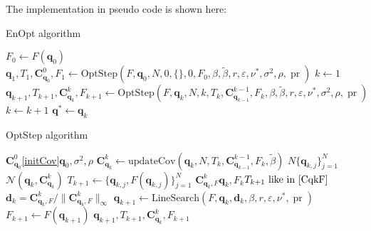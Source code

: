 The implementation in pseudo code is shown here:
\begin{algorithm}[H]%
\caption{EnOpt algorithm}
\begin{algorithmic}[1]
\State $F_{{0}}\gets F(\mathbf{q}_0)$
\State $\mathbf{q}_{1},T_{1},\mathbf{C}_{\mathbf{q}_{0}}^{0},F_{1}\gets\mathrm{OptStep}(F,\mathbf{q}_0,N,0,\{\},0,F_{0},\beta,\tilde{\beta},r,\varepsilon,\nu^*,\sigma^2,\rho,\operatorname{pr})$
\State $k\gets 1$
\State $\mathbf{q}_{k+1},T_{k+1},\mathbf{C}_{\mathbf{q}_{k}}^{k},F_{k+1}\gets\mathrm{OptStep}(F,\mathbf{q}_k,N,k,T_k,\mathbf{C}_{\mathbf{q}_{k-1}}^{k-1},F_k,\beta,\tilde{\beta},r,\varepsilon,\nu^*,\sigma^2,\rho,\operatorname{pr})$
\State $k\gets k+1$
\EndWhile
\State \Return $\mathbf{q}^*\gets\mathbf{q}_k$
\EndProcedure
\end{algorithmic}
\end{algorithm}
\begin{algorithm}[H]%
\caption{OptStep algorithm}
\begin{algorithmic}[1]
\State {}$\mathbf{C}_{\mathbf{q}_0}^0$\eqref{initCov}$\mathbf{q}_0,\sigma^2,\rho$
\Else
\State $\mathbf{C}_{\mathbf{q}_{k}}^{k} \gets \mathrm{updateCov}(\mathbf{q}_k, N, T_k, \mathbf{C}_{\mathbf{q}_{k-1}}^{k-1}, F_k ,\tilde{\beta})$
\EndIf
\State {}$N$$\{\mathbf{q}_{k,j}\}_{j=1}^N$$\mathcal{N}(\mathbf{q}_{k},\mathbf{C}_{\mathbf{q}_{k}}^{k})$
\State $T_{k+1}\gets\{\mathbf{q}_{k,j},F(\mathbf{q}_{k,j})\}_{j=1}^N$
\State {}$\mathbf{C}_{\mathbf{q}_{k},F}^{k}$$\mathbf{q}_k,F_k$$T_{k+1}\text{ like in }\eqref{CqkF}$
\State {}$\mathbf{d}_k=\mathbf{C}_{\mathbf{q}_{k},F}^{k}/\|\mathbf{C}_{\mathbf{q}_{k},F}^{k}\|_\infty$
\State $\mathbf{q}_{k+1}\gets\mathrm{LineSearch}(F,\mathbf{q}_k,\mathbf{d}_k,\beta,r,\varepsilon,\nu^*,\operatorname{pr})$
\State $F_{k+1}\gets F(\mathbf{q}_{k+1})$
\State \Return $\mathbf{q}_{k+1},T_{k+1},\mathbf{C}_{\mathbf{q}_k}^k,F_{k+1}$
\EndProcedure
\end{algorithmic}
\end{algorithm}
